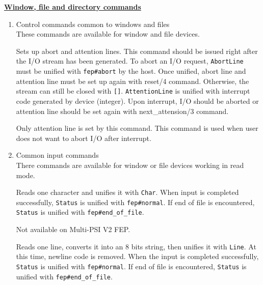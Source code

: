 \noindent\underline{\bf Window, file and directory commands}
 
\vspace{1ex}\par
\begin{enumerate}
\item Control commands common to windows and files\\

These commands are available for window and file devices.
\begin{itemize}

Sets up abort and attention lines. This command should be issued
right after the I/O stream has been generated. To abort an I/O request,
\verb|AbortLine| must be unified with \verb|fep#abort| by the host.  Once
unified, abort line and attention line must be set up again
with reset/4 command. Otherwise, the stream can still be closed with
\verb|[]|. \verb|AttentionLine| is unified with interrupt code generated by
device (integer). Upon interrupt,
I/O should be aborted or attention line should be set again
with next_attension/3 command.

Only attention line is set by this command. This command is used
when user does not want to abort I/O after interrupt.

\end{itemize}

\item Common input commands\\

There commands are available for window or file devices working in
read mode.
\begin{itemize}

Reads one character and unifies it with \verb|Char|. When input is
completed successfully, \verb|Status| is unified with
\verb|fep#normal|. If end of file is encountered,
\verb|Status| is unified with \verb|fep#end_of_file|.

\Caution Not available on Multi-PSI V2 FEP.

Reads one line, converts it into an 8 bits string, then unifies it with
\verb|Line|.  At this time, newline code is removed. When the input is
completed successfully, \verb|Status| is unified with
\verb|fep#normal|. If end of file is encountered,
\verb|Status| is unified with \verb|fep#end_of_file|.


\end{itemize}
\end{enumerate}
